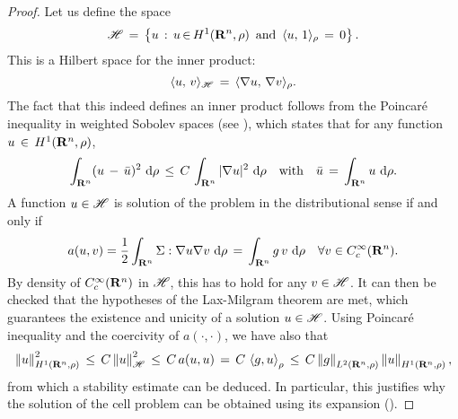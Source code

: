\iflong \begin{proof}
    Let us define the space 
    $$
        \mathscr H \,=\,\left\{u\,:\, u\,{\in}\,H^1(\mathbf R^n,\rho)\,\text{ and }\,\langle
            u,\,1\rangle_{\rho}\,=\, 0\right\}. 
    $$
    This is a Hilbert space for the inner product:
    $$
        \langle u,\,v\rangle_{\mathscr H} \,=\, \langle {\nabla}u,\, {\nabla}v\rangle_{\rho}.  
    $$
    The fact that this indeed defines an inner product follows from the
    Poincar\'e inequality in weighted Sobolev spaces (see
    \citep{arnold2007interpolation,beckner1989generalized}), which states that
    for any function $u\,\in\,H^{1}(\mathbf R^n, \rho)$,
    $$
        \int_{\mathbf R^n} (u\,-\,\bar u)^2 \, \,\mathrm d \rho\, \leq \,C\,\int_{\mathbf R^n} |\nabla
        u|^2 \,\,\mathrm d \rho \quad \text{with}\quad \bar u \,=\, \int_{\mathbf R^n} u\,\,\mathrm d \rho.
    $$
    A function $u\in \mathscr H$ is solution of the problem in the
    distributional sense if and only if
    $$
        a(u,v) = \frac{1}{2} \int_{\mathbf R^n}  \Sigma : \nabla u \nabla v \,
        \,\mathrm d \rho \,=\, \int_{\mathbf R^n} g \,v\,\,\mathrm d \rho \quad \forall v \in C^\infty_c(\mathbf R^n).
    $$
    By density of $C^\infty_c(\mathbf R^n)$ in $\mathscr H$, this has to hold for any $v \in
    \mathscr H$. It can then be checked that the hypotheses of the Lax-Milgram
    theorem are met, which guarantees the existence and unicity of a solution 
    $u \in \mathscr H$. Using Poincar\'e inequality and the coercivity of
    $a(\cdot,\cdot)$, we have also that
    $$
        \left\| u \right\|_{H^{1}(\mathbf R^n, \rho)}^2 \,\leq\, C  \left\| u \right\|_{\mathscr
            H}^2 \,\leq\, C\,a(u,u) \,=\, C\, \left \langle g,u \right\rangle_{\rho} \,\leq\, C
        \left\| g \right\|_{L^{2}(\mathbf R^n,\rho)}
        \left\| u \right\|_{H^{1}(\mathbf R^n, \rho)}, 
    $$
    from which a stability estimate can be deduced. In particular, this
    justifies why the solution of the cell problem can be obtained using its
    expansion ().


\end{proof}
